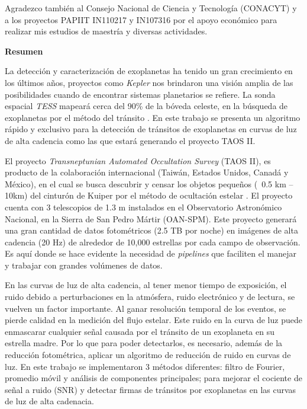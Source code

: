 Agradezco también al Consejo Nacional de Ciencia y Tecnología (CONACYT) y a los proyectos PAPIIT IN110217 y IN107316 por el apoyo económico para realizar mis estudios de maestría y diversas actividades.

\thispagestyle{plain}
\tableofcontents
\thispagestyle{plain}\thispagestyle{plain}


\thispagestyle{plain}
\listoffigures
{}
\thispagestyle{plain}\thispagestyle{plain}

\thispagestyle{plain}
\newpage

\thispagestyle{plain}
\centerline{\textbf{Resumen}}

La detección y caracterización de exoplanetas ha tenido un gran crecimiento en los últimos años, proyectos como \textit{Kepler} nos brindaron una visión amplia de las posibilidades cuando de encontrar sistemas planetarios se refiere. La sonda espacial \textit{TESS} mapeará cerca del 90\% de la bóveda celeste, en la búsqueda de exoplanetas por el método del tránsito \cite{ricker2014transiting}. En este trabajo se presenta un algoritmo rápido y exclusivo para la detección de tránsitos de exoplanetas en curvas de luz de alta cadencia como las que estará generando el proyecto TAOS II.  

El proyecto \textit{Transneptunian Automated Occultation Survey} (TAOS II), es producto de la colaboración internacional (Taiwán, Estados Unidos, Canadá y México), en el cual se busca descubrir y censar los objetos pequeños (~0.5 km – 10km) del cinturón de Kuiper por el método de ocultación estelar \cite{lehner2012transneptunian}. El proyecto cuenta con 3 telescopios de 1.3 m instalados en el Observatorio Astronómico Nacional, en la Sierra de San Pedro Mártir (OAN-SPM). Este proyecto generará una gran cantidad de datos fotométricos (2.5 TB por noche) en imágenes de alta cadencia (20 Hz) de alrededor de 10,000 estrellas por cada campo de observación. Es aquí donde se hace evidente la necesidad de \textit{pipelines} que faciliten el manejar y trabajar con grandes volúmenes de datos. 

En las curvas de luz de alta cadencia, al tener menor tiempo de exposición, el ruido debido a perturbaciones en la atmósfera, ruido electrónico y de lectura, se vuelven un factor importante. Al ganar resolución temporal de los eventos, se pierde calidad en la medición del flujo estelar. Este ruido en la curva de luz puede enmascarar cualquier señal causada por el tránsito de un exoplaneta en su estrella madre. Por lo que para poder detectarlos, es necesario, además de la reducción fotométrica, aplicar un algoritmo de reducción de ruido en curvas de luz. En este trabajo se implementaron 3 métodos diferentes: filtro de Fourier, promedio móvil y análisis de componentes principales; para mejorar el cociente de señal a ruido (SNR) y detectar firmas de tránsitos por exoplanetas en las curvas de luz de alta cadenacia. 

